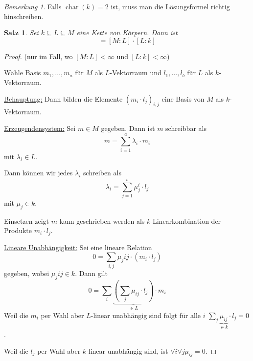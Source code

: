 \documentclass[a4paper,12pt,numbers=noenddot,parskip=full]{scrartcl}
\newcommand{\heading}{\underline}
\DeclareMathOperator{\charac}{char}
\theoremstyle{dotless}
\newtheorem{theorem}{Satz}[section]
\theoremstyle{remark}
\newtheorem*{remark}{Bemerkung}
\begin{document}
	\begin{remark}
		Falls $\charac(k) = 2$ ist, muss man die Lösungsformel richtig hinschreiben.
	\end{remark}

	\begin{theorem}
		Sei $k \subseteq L \subseteq M$ eine Kette von Körpern. Dann ist
		\begin{equation*}
			[M:k] = [M:L] \cdot [L:k]
		\end{equation*}
	\end{theorem}

	\begin{proof}(nur im Fall, wo $[M:L] < \infty$ und $[L:k] < \infty$)

		Wähle Basis $m_1, \dots, m_a$ für $M$ als $L$-Vektorraum und $l_1, \dots, l_b$ für $L$ als $k$-Vektorraum.
		
		\heading{Behauptung:} Dann bilden die Elemente $(m_i \cdot l_j)_{i,j}$ eine Basis von $M$ als $k$-Vektorraum.
		
		\heading{Erzeugendensystem:} Sei $m \in M$ gegeben. Dann ist $m$ schreibbar als 
		\begin{equation*}
			m = \sum_{i = 1}^{a} \lambda_i \cdot m_i
		\end{equation*}
		mit $\lambda_i \in L$.
		
		Dann können wir jedes $\lambda_i$ schreiben als
		\begin{equation*}
			\lambda_i = \sum_{j = 1}^{b} \mu_j^i \cdot l_j
		\end{equation*}
		mit $\mu_j \in k$.
		
		Einsetzen zeigt $m$ kann geschrieben werden als $k$-Linearkombination der Produkte $m_i \cdot l_j$.
		
		\heading{Lineare Unabhängigkeit:} Sei eine lineare Relation
		\begin{equation*}
			0 = \sum_{i,j} \mu_j{ij} \cdot (m_i \cdot l_j)
		\end{equation*}
		gegeben, wobei $\mu_j{ij} \in k$. Dann gilt
		\begin{equation*}
			0 = \sum_{i} \underbrace{\left( \sum_{j} \mu_{ij} \cdot l_j \right)}_{\in L} \cdot m_i
		\end{equation*}
		Weil die $m_i$ per Wahl aber $L$-linear unabhängig sind folgt für alle $i$ $\sum_{j} \underbrace{\mu_{ij}}_{\in k} \cdot l_j = 0$.
		
		Weil die $l_j$ per Wahl aber $k$-linear unabhängig sind, ist $\forall i \forall j \mu_{ij} = 0$.
	\end{proof}
\end{document}

